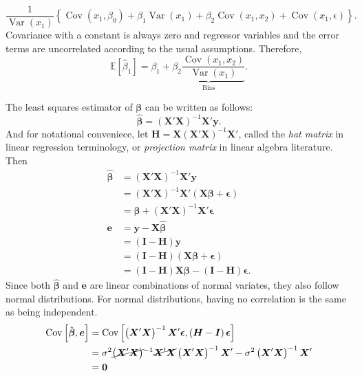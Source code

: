 \documentclass[answers]{exam}
\newcommand{\bs}{\boldsymbol}
\newcommand{\opn}{\operatorname}
\begin{document}
\begin{questions}
\begin{solution}
   $$
   \frac{1}{\opn{Var}\left(x_{1}\right)}\left\{\opn{Cov}\left(x_{1}, \beta_{0}\right)+\beta_{1}\opn{Var}\left(x_{1}\right)+\beta_{2}\opn{Cov}\left(x_{1},x_{2}\right)+\opn{Cov}\left(x_{1},\epsilon\right) \right\}.
   $$
   Covariance with a constant is always zero and regressor variables and the error terms are uncorrelated according to the usual assumptions. Therefore,
   $$
   \mathbb{E}\left[\hat{\beta}_{1}\right] = \beta_{1} +\underbrace{\beta_{2}\frac{\opn{Cov}\left(x_{1},x_{2}\right)}{\opn{Var}\left(x_{1}\right)}}_{\text{Bias}}.
   $$
   \end{solution}
   \begin{solution}
   The least squares estimator of $\bs{\beta}$ can be written as follows:
   $$
      \hat{\bs{\beta}} = \left(\bs{X}'\bs{X}\right)^{-1}\bs{X}'\bs{y}.
   $$
   And for notational conveniece, let $\bs{H}=\bs{X}\left(\bs{X}'\bs{X}\right)^{-1}\bs{X}'$, called the \emph{hat matrix} in linear regression terminology, or \emph{projection matrix} in linear algebra literature. Then
   \begin{align*}
      \hat{\bs{\beta}} &= \left(\bs{X}'\bs{X}\right)^{-1}\bs{X}'\bs{y}\\
      &= \left(\bs{X}'\bs{X}\right)^{-1}\bs{X}'\left(\bs{X\beta}+\bs{\epsilon}\right)\\
      &= \bs{\beta} + \left(\bs{X}'\bs{X}\right)^{-1}\bs{X}'\bs{\epsilon}\\
      \bs{e} &= \bs{y} -\bs{X}\hat{\bs{\beta}}\\
      &= \left(\bs{I} -\bs{H}\right)\bs{y}\\
      &= \left(\bs{I}-\bs{H}\right)\left(\bs{X\beta}+\bs{\epsilon}\right)\\
      &= \left(\bs{I}-\bs{H}\right)\bs{X\beta} -\left(\bs{I}-\bs{H}\right)\bs{\epsilon}.
   \end{align*}
   Since both $\hat{\bs{\beta}}$ and $\bs{e}$ are linear combinations of normal variates, they also follow normal distributions. For normal distributions, having no correlation is the same as being independent.
   \begin{align*}
      \opn{Cov}\left[\hat{\bs{\beta}}, \bs{e}\right] &= \opn{Cov}\left[\left(\bs{X}'\bs{X}\right)^{-1}\bs{X}'\bs{\epsilon}, \left(\bs{H}-\bs{I}\right)\bs{\epsilon} \right]\\
      &= \sigma^{2}\cancel{\left(\bs{X}'\bs{X} \right)}^{-1}\cancel{\bs{X}'\bs{X}}\left(\bs{X}'\bs{X} \right)^{-1}\bs{X}' - \sigma^{2}\left(\bs{X}'\bs{X}\right)^{-1}\bs{X}'\\
      &= \bs{0}

\end{align*}
\end{solution}
\end{questions}
\end{document}
